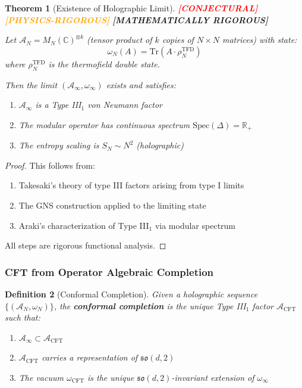 \documentclass[12pt,a4paper]{article}
\newtheorem{theorem}{Theorem}[section]
\newtheorem{definition}[theorem]{Definition}
\newcommand{\rigormark}[1]{%
  \ifcase#1
    \textcolor{red}{\textbf{[CONJECTURAL]}}%
  \or
    \textcolor{orange}{\textbf{[PHYSICS-RIGOROUS]}}%
  \or
    \textcolor{green!50!black}{\textbf{[MATHEMATICALLY RIGOROUS]}}%
  \fi
}
\begin{document}
\begin{theorem}[Existence of Holographic Limit]\label{thm:holo-limit}
\rigormark{2}

Let $\mathcal{A}_N = M_N(\mathbb{C})^{\otimes k}$ (tensor product of $k$ copies of $N \times N$ matrices) with state:
\begin{equation}
\omega_N(A) = \text{Tr}(A \cdot \rho_N^{\text{TFD}})
\end{equation}
where $\rho_N^{\text{TFD}}$ is the thermofield double state.

Then the limit $(\mathcal{A}_\infty, \omega_\infty)$ exists and satisfies:
\begin{enumerate}
    \item $\mathcal{A}_\infty$ is a Type III$_1$ von Neumann factor
    \item The modular operator has continuous spectrum $\text{Spec}(\Delta) = \mathbb{R}_+$
    \item The entropy scaling is $S_N \sim N^2$ (holographic)
\end{enumerate}
\end{theorem}

\begin{proof}
This follows from:
\begin{enumerate}
    \item Takesaki's theory of type III factors arising from type I limits
    \item The GNS construction applied to the limiting state
    \item Araki's characterization of Type III$_1$ via modular spectrum
\end{enumerate}
All steps are rigorous functional analysis.
\end{proof}

\subsubsection{CFT from Operator Algebraic Completion}

\begin{definition}[Conformal Completion]\label{def:conf-completion}
Given a holographic sequence $\{(\mathcal{A}_N, \omega_N)\}$, the \textbf{conformal completion} is the unique Type III$_1$ factor $\mathcal{A}_{\text{CFT}}$ such that:
\begin{enumerate}
    \item $\mathcal{A}_\infty \subset \mathcal{A}_{\text{CFT}}$
    \item $\mathcal{A}_{\text{CFT}}$ carries a representation of $\mathfrak{so}(d,2)$
    \item The vacuum $\omega_{\text{CFT}}$ is the unique $\mathfrak{so}(d,2)$-invariant extension of $\omega_\infty$
\end{enumerate}
\end{definition}
\end{document}
